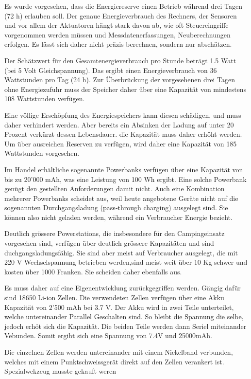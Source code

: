 Es wurde vorgesehen, dass die Energiereserve einen Betrieb während drei Tagen (72 h) erlauben soll. Der genaue Energieverbrauch des Rechners, der Sensoren und vor allem der Aktuatoren hängt stark davon ab, wie oft Steuereingriffe vorgenommen werden müssen und Messdatenerfassungen, Neuberechnungen erfolgen. Es lässt sich daher nicht präzis berechnen, sondern nur abschätzen. 

Der Schätzwert für den Gesamtenergieverbrauch pro Stunde beträgt 1.5 Watt (bei 5 Volt Gleichspannung). Das ergibt einen Energieverbrauch von 36 Wattstunden pro Tag (24 h). Zur Überbrückung der vorgesehenen drei Tagen ohne Energiezufuhr muss der Speicher daher über eine Kapazität von mindestens 108 Wattstunden verfügen. 

Eine völlige Erschöpfung des Energiespeichers kann diesen schädigen, und muss daher verhindert werden. Aber bereits ein Absinken der Ladung auf unter 20 Prozent verkürzt dessen Lebensdauer. die Kapazität muss daher erhöht werden. Um über ausreichen Reserven zu verfügen, wird daher eine Kapazität von 185 Wattstunden vorgesehen.

Im Handel erhältliche sogenannte Powerbanks verfügen über eine Kapazität von bis zu 20'000 mAh, was eine Leistung von 100 Wh ergibt. Eine solche Powerbank genügt den gestellten Anforderungen damit nicht. Auch eine Kombination mehrerer Powerbanks scheidet aus, weil heute angebotene Geräte nicht auf die sogenannten Durchgangsladung (pass‐through charging) ausgelegt sind. Sie können also nicht geladen werden, während ein Verbraucher Energie bezieht.  

Deutlich grössere Powerstations, die insbesondere für den Campingeinsatz vorgesehen sind, verfügen über deutlich grössere Kapazitäten und sind duchgangsladungsfähig. Sie sind aber meist auf Verbraucher ausgelegt, die mit 220 V Wechselspannung betrieben werden,sind meist weit über 10 Kg schwer und kosten über 1000 Franken. Sie scheiden daher ebenfalls aus.   

Es muss daher auf eine Eigenentwicklung zurückgegriffen werden. Gängig dafür sind 18650 Li-ion Zellen. Die verwendeten Zellen verfügen über eine Akku Kapazität von 2'500 mAh bei 3.7 V. 
Der Akku wird in zwei Teile unterteilet, welche untereinander Parallel Geschalten sind. So bleibt die Spannung die selbe, jedoch erhöt sich die Kapazität. Die beiden Teile werden dann Seriel miteinander Vebunden. Somit ergibt sich eine Spannung von 7.4V und 25000mAh. 

Die einzelnen Zellen werden untereinander mit einem Nickelband verbunden, welches mit einem Punktschweissgerät direkt auf den Zellen verankert ist. Spezialwekzeug musste gekauft weren




